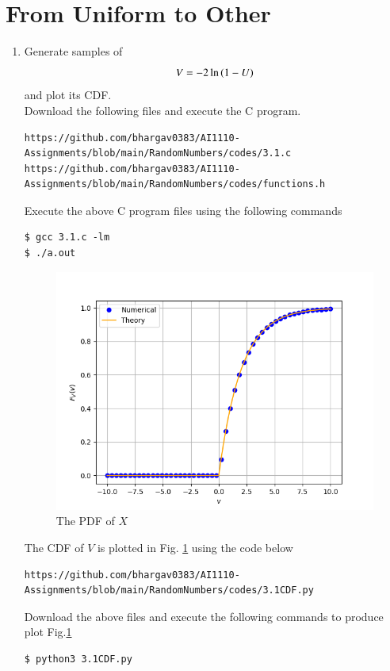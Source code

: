 \documentclass[journal,12pt,twocolumn]{IEEEtran}
\renewcommand\thesection{\arabic{section}}
\begin{document}
\section{From Uniform to Other}
\begin{enumerate}[label=\thesection.\arabic*
,ref=\thesection.\theenumi]
%
\item
Generate samples of 
%
\begin{equation}
V = -2\ln\left(1-U\right)
\end{equation}
%
and plot its CDF.  \\
\solution Download the following files and execute the  C program.
\begin{lstlisting}
https://github.com/bhargav0383/AI1110-Assignments/blob/main/RandomNumbers/codes/3.1.c
https://github.com/bhargav0383/AI1110-Assignments/blob/main/RandomNumbers/codes/functions.h
\end{lstlisting}
Execute the above C program files using the following commands
\begin{lstlisting}
$ gcc 3.1.c -lm
$ ./a.out
\end{lstlisting}
\begin{figure}[!h]
\centering
\includegraphics[width=\columnwidth]{./figs/3.1CDF.png}
\caption{The PDF of $X$}
\label{fig:3.1}
\end{figure}
The CDF of $V$ is plotted in Fig. \ref{fig:3.1} using the code below
\begin{lstlisting}
https://github.com/bhargav0383/AI1110-Assignments/blob/main/RandomNumbers/codes/3.1CDF.py
\end{lstlisting}
Download the above files and execute the following commands to produce plot Fig.\ref{fig:3.1}
\begin{lstlisting}
$ python3 3.1CDF.py
\end{lstlisting}


\end{enumerate}
\end{document}

